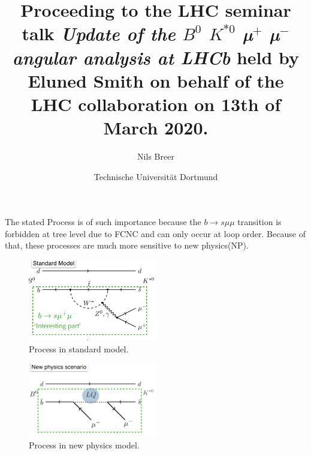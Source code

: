 


\setlength{\oddsidemargin}{0.0 cm}
\setlength{\evensidemargin}{0.0 cm}
\setlength{\topmargin}{-1cm}
\setlength{\textheight}{24 cm}
\setlength{\textwidth}{16 cm}

\pagestyle{plain}

\setlength{\parindent}{0in}



\author{Nils Breer}
\date{Technische Universit\"at Dortmund}

\title{Proceeding to the LHC seminar talk \textit{Update of the $B^0$ \to $K^{*0}$ µ$^{+}$ µ$^{-}$ angular analysis at LHCb} held by Eluned Smith on behalf of the LHC collaboration on 13th of March 2020.}

\maketitle


The stated Process is of such importance because the
$b \to s \mu \mu$ transition is forbidden at tree level due to FCNC and can only occur at loop order.
Because of that, these processes are much more sensitive to new physics(NP).

\begin{figure}[htb]
  \centering
  \includegraphics[width=0.5\textwidth]{pictures/sm_flavordiagram.png}
  \caption{Process in standard model.}
  \label{fig:sm_process}
\end{figure}

\begin{figure}[htb]
  \centering
  \includegraphics[width=0.5\textwidth]{pictures/NP_flavordiagram.png}
  \caption{Process in new physics model.}
  \label{fig:np_process}
\end{figure}

